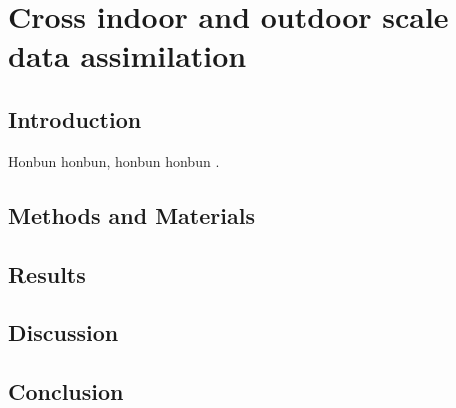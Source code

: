 \chapter{Cross indoor and outdoor scale data assimilation}

\section{Introduction}

Honbun honbun, honbun honbun \citep{zhao_crop_2019}. 


\section{Methods and Materials}


\section{Results}

\section{Discussion}

\section{Conclusion}